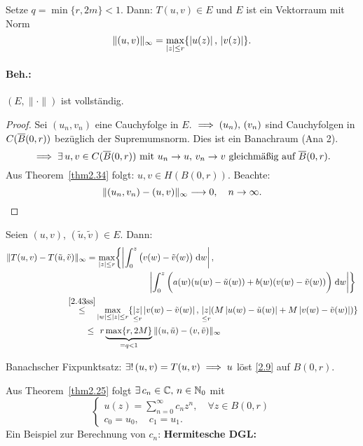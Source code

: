 \documentclass[a4paper,twoside,DIV15,BCOR12mm]{scrbook}
\begin{document}
\begin{bsp}
Setze $q=\min\{r,2m\}<1$. Dann: $T(u,v)\in E$ und $E$ ist ein Vektorraum mit Norm
\[\|(u,v)\|_\infty=\max_{\left\lvert z\right\lvert\leq r}\{\left\lvert u(z)\right\lvert,\,\left\lvert v(z)\right\lvert\}.\]

\vspace*{-20pt}\paragraph{Beh.:} $(E,\|\cdot\|)$ ist vollständig.
\begin{proof} Sei $(u_n,v_n)$ eine Cauchyfolge in $E$. $\implies (u_n),\,(v_n)$ sind Cauchyfolgen in $C(\overline{B}(0,r))$ bezüglich der Supremumsnorm. Dies ist ein Banachraum (Ana 2).
\[\implies\exists\, u,v\in C(\overline{B}(0,r))\text{ mit }u_n\to u,\,v_n\to v\text{ gleichmäßig auf }\overline{B}(0,r).\]
Aus Theorem~\ref{thm2.34} folgt: $u,v\in H(B(0,r))$. Beachte:
\[\|(u_n,v_n)-(u,v)\|_\infty\longrightarrow 0,\quad n\to \infty.\qedhere\]
\end{proof}

Seien $(u,v)$, $(\tilde{u},\tilde{v})\in E$. Dann:
\begin{align*}
\|T(u,v)-T(\tilde{u},\tilde{v})\|_\infty=&\,\max_{\left\lvert z\right\lvert\leq r}\biggl\{\left\lvert\int_{0}^{z}{\bigl(v(w)-\tilde{v}(w)\bigr)}\;\mathrm{d} w\right\lvert,\\
&\qquad\qquad\qquad\left\lvert\int_{0}^{z}{\biggl(a(w)(u(w)-\tilde{u}(w))+b(w)(v(w)-\tilde{v}(w))\biggr)}\;\mathrm{d} w\right\lvert\biggr\}\\
\overset{\eqref{2.43ss}}{\leq}&\max_{\left\lvert w\right\lvert\leq\left\lvert z\right\lvert\leq r}\{\underset{\leq r}{\left\lvert z\right\lvert}\left\lvert v(w)-\tilde{v}(w)\right\lvert,\,\underset{\leq r}{\left\lvert z\right\lvert}(M\left\lvert u(w)-\tilde{u}(w)\right\lvert+M\left\lvert v(w)-\tilde{v}(w)\right\lvert)\}\\
\leq\, &\:\;r\underbrace{\max\{r,2M\}}_{=q<1}\|(u,\tilde{u})-(v,\tilde{v})\|_\infty
\end{align*}

Banachscher Fixpunktsatz: $\exists!\,(u,v)=T(u,v)\implies u$ löst \eqref{2.9} auf $B(0,r)$.

Aus Theorem~\ref{thm2.25} folgt $\exists\, c_n\in\mathbb{C},\, n\in\mathbb{N}_0$ mit 
\begin{equation}\label{2.10}\begin{cases}
u(z)=\sum_{n=0}^{\infty}c_n z^n,\quad\forall z\in B(0,r)\\
c_0=u_0,\quad c_1=u_1.
\end{cases}\end{equation}
Ein Beispiel zur Berechnung von $c_n$: \textbf{Hermitesche DGL:}


\end{bsp}
\end{document}
